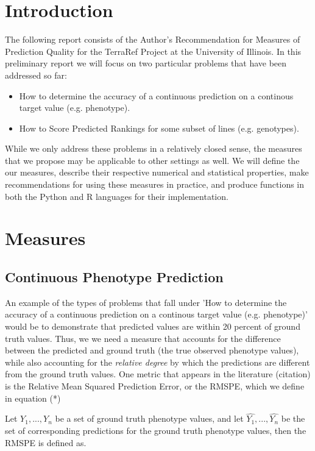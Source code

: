 \section{Introduction}

The following report consists of the Author's Recommendation for Measures of Prediction Quality for the TerraRef Project at the University of Illinois. In this 
preliminary report we will focus on two particular problems that have been addressed so far:

\begin{itemize}
	\item How to determine the accuracy of a continuous prediction on a continous target value (e.g. phenotype).
	\item How to Score Predicted Rankings for some subset of lines (e.g. genotypes).
\end{itemize}

While we only address these problems in a relatively closed sense, the measures that we propose may be applicable to other settings as well. We will define the our measures, describe their respective numerical and statistical properties, make recommendations for using these measures in practice, and produce functions in both the Python and R languages for their implementation. 


\section{Measures}
\label{sec:examples}

\subsection{Continuous Phenotype Prediction}

An example of the types of problems that fall under 'How to determine the accuracy of a continuous prediction on a continous target value (e.g. phenotype)' would be to demonstrate that predicted values are within 20 percent of ground truth values. Thus, we we need a measure that accounts for the difference between the predicted and ground truth (the true observed phenotype values), while also accounting for the \textit{relative degree} by which the predictions are different from the ground truth values. One metric that appears in the literature (citation) is the Relative Mean Squared Prediction Error, or the RMSPE, which we define in equation (*)

Let $Y_1, ..., Y_n$ be a set of ground truth phenotype values, and let $\hat{Y_1}, ..., \hat{Y_n}$ be the set of corresponding predictions for the ground truth phenotype values, then the RMSPE is defined as.

